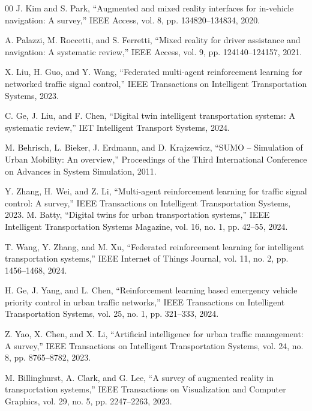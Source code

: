 \documentclass[conference]{IEEEtran}
\begin{document}
\begin{thebibliography}{00}
 J. Kim and S. Park, “Augmented and mixed reality interfaces for in-vehicle navigation: A survey,” IEEE Access, vol. 8, pp. 134820–134834, 2020.

 A. Palazzi, M. Roccetti, and S. Ferretti, “Mixed reality for driver assistance and navigation: A systematic review,” IEEE Access, vol. 9, pp. 124140–124157, 2021.

 X. Liu, H. Guo, and Y. Wang, “Federated multi-agent reinforcement learning for networked traffic signal control,” IEEE Transactions on Intelligent Transportation Systems, 2023.

 C. Ge, J. Liu, and F. Chen, “Digital twin intelligent transportation systems: A systematic review,” IET Intelligent Transport Systems, 2024.

 M. Behrisch, L. Bieker, J. Erdmann, and D. Krajzewicz,
“SUMO – Simulation of Urban Mobility: An overview,”
Proceedings of the Third International Conference on Advances in System Simulation, 2011.

 Y. Zhang, H. Wei, and Z. Li,
“Multi-agent reinforcement learning for traffic signal control: A survey,”
IEEE Transactions on Intelligent Transportation Systems, 2023.
 M. Batty,
“Digital twins for urban transportation systems,”
IEEE Intelligent Transportation Systems Magazine,
vol. 16, no. 1, pp. 42–55, 2024.

 T. Wang, Y. Zhang, and M. Xu,
“Federated reinforcement learning for intelligent transportation systems,”
IEEE Internet of Things Journal,
vol. 11, no. 2, pp. 1456–1468, 2024.

 H. Ge, J. Yang, and L. Chen,
“Reinforcement learning based emergency vehicle priority control in urban traffic networks,”
IEEE Transactions on Intelligent Transportation Systems,
vol. 25, no. 1, pp. 321–333, 2024.

 Z. Yao, X. Chen, and X. Li,
“Artificial intelligence for urban traffic management: A survey,”
IEEE Transactions on Intelligent Transportation Systems,
vol. 24, no. 8, pp. 8765–8782, 2023.

 M. Billinghurst, A. Clark, and G. Lee,
“A survey of augmented reality in transportation systems,”
IEEE Transactions on Visualization and Computer Graphics,
vol. 29, no. 5, pp. 2247–2263, 2023.

\end{thebibliography}
\end{document}
